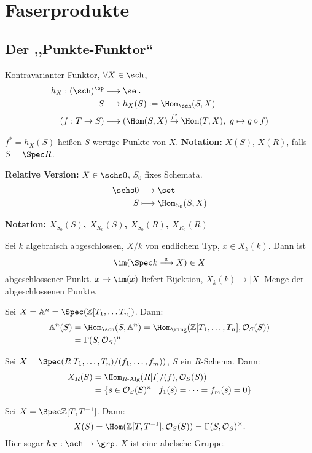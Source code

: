 \chapter{Faserprodukte}

\section{Der ,,Punkte-Funktor``}

Kontravarianter Funktor, $\forall X\in\sch$,
\begin{align*}
  h_{X}:(\sch)^{\op} & \longrightarrow\set\\
  S & \longmapsto h_{X}(S):=\Hom_{\sch}(S,X)\\
  (f:T\rightarrow S) & \longmapsto(\Hom(S,X)\overset{f^{\ast}}{\rightarrow}\Hom(T,X),\ g\mapsto g\circ f)
\end{align*}

$f^{\ast}=h_{X}(S)$ heißen $S$-wertige Punkte von $X$. \textbf{Notation:
}$X(S)$, $X(R)$, falls $S=\Spec R$.

\textbf{Relative Version:} $X\in\schs0$, $S_{0}$ fixes Schemata.
\begin{align*}
  \schs0 & \longrightarrow\set\\
  S & \longmapsto\Hom_{S_{0}}(S,X)
\end{align*}

\textbf{Notation: $X_{S_{0}}(S)$, $X_{R_{0}}(S)$, $X_{S_{0}}(R)$,
  $X_{R_{0}}(R)$}
\begin{example}
  Sei $k$ algebraisch abgeschlossen, $X/k$ von endlichem Typ, $x\in X_{k}(k)$.
  Dann ist
  \[
    \im(\Spec k\overset{x}{\longrightarrow}X)\in X
  \]
  abgeschlossener Punkt. $x\mapsto\im(x)$ liefert Bijektion, $X_{k}(k)\rightarrow|X|$
  Menge der abgeschlossenen Punkte.
\end{example}

\begin{example}
  Sei $X=\mathbb{A}^{n}=\Spec(\mathbb{Z}[T_{1},\ldots T_{n}])$. Dann:
  \begin{align*}
    \mathbb{A}^{n}(S) & =\Hom_{\sch}(S,\mathbb{A}^{n})=\Hom_{\ring}(\mathbb{Z}[T_{1},\ldots,T_{n}],\mathcal{O}_{S}(S))\\
                      & =\Gamma(S,\mathcal{O}_{S})^{n}
  \end{align*}
\end{example}

\begin{example}
  Sei $X=\Spec(R[T_{1},\ldots,T_{n})/(f_{1},\ldots,f_{m}))$, $S$ ein
  $R$-Schema. Dann:
  \begin{align*}
    X_{R}(S) & =\Hom_{R\text{-Alg}}(R[I]/(f),\mathcal{O}_{S}(S))\\
             & =\{s\in\mathcal{O}_{S}(S)^{n}\mid f_{1}(s)=\cdots=f_{m}(s)=0\}
  \end{align*}
\end{example}

\begin{example}
  Sei $X=\Spec\mathbb{Z}[T,T^{-1}]$. Dann:
  \[
    X(S)=\Hom(\mathbb{Z}[T,T^{-1}],\mathcal{O}_{S}(S))=\Gamma(S,\mathcal{O}_{S})^{\times}.
  \]
  Hier sogar $h_{X}:\sch\rightarrow\grp$. $X$ ist eine abelsche Gruppe.
\end{example}
